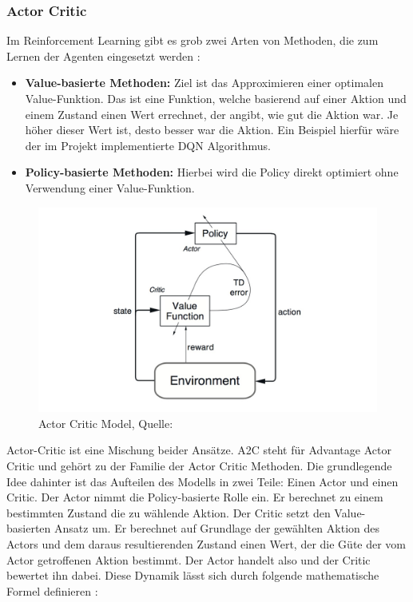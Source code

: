 \documentclass[12pt,a4paper]{article}
\begin{document}
\subsubsection{Actor Critic}
Im Reinforcement Learning gibt es grob zwei Arten von Methoden, die zum Lernen der Agenten eingesetzt werden \cite{theaisummer:actor_critic}:

\begin{itemize}
	\item \textbf{Value-basierte Methoden:} Ziel ist das Approximieren einer optimalen Value-Funktion. Das ist eine Funktion, welche basierend auf einer Aktion und einem Zustand einen Wert errechnet, der angibt, wie gut die Aktion war. Je höher dieser Wert ist, desto besser war die Aktion. Ein Beispiel hierfür wäre der im Projekt implementierte DQN Algorithmus.
	\item \textbf{Policy-basierte Methoden:} Hierbei wird die Policy direkt optimiert ohne Verwendung einer Value-Funktion.
\end{itemize}

\begin{figure}[!h]
	\includegraphics[width=\textwidth]{gfx/actor_critic_model}
	\caption{Actor Critic Model, Quelle: \cite{medium:actor_critic}}
	\label{fig:actor_critic_model}
\end{figure}

Actor-Critic ist eine Mischung beider Ansätze.
A2C steht für Advantage Actor Critic und gehört zu der Familie der Actor Critic Methoden.
Die grundlegende Idee dahinter ist das Aufteilen des Modells in zwei Teile: Einen Actor und einen Critic.
Der Actor nimmt die Policy-basierte Rolle ein.
Er berechnet zu einem bestimmten Zustand die zu wählende Aktion. Der Critic setzt den Value-basierten Ansatz um.
Er berechnet auf Grundlage der gewählten Aktion des Actors und dem daraus resultierenden Zustand einen Wert, der die Güte der vom Actor getroffenen Aktion bestimmt.
Der Actor handelt also und der Critic bewertet ihn dabei.
Diese Dynamik lässt sich durch folgende mathematische Formel definieren \cite{theaisummer:actor_critic}: 
\end{document}
